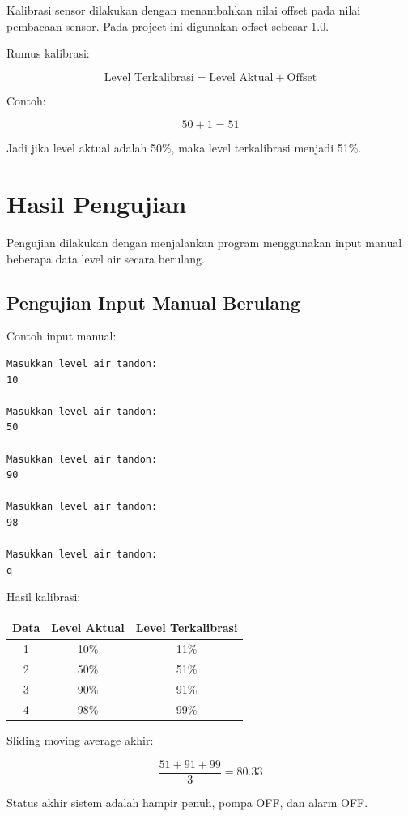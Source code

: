 \documentclass[12pt,a4paper]{article}
\begin{document}
Kalibrasi sensor dilakukan dengan menambahkan nilai offset pada nilai pembacaan sensor. Pada project ini digunakan offset sebesar 1.0.

Rumus kalibrasi:

\[
\text{Level Terkalibrasi} = \text{Level Aktual} + \text{Offset}
\]

Contoh:

\[
50 + 1 = 51
\]

Jadi jika level aktual adalah 50\%, maka level terkalibrasi menjadi 51\%.

\section{Hasil Pengujian}

Pengujian dilakukan dengan menjalankan program menggunakan input manual beberapa data level air secara berulang.

\subsection{Pengujian Input Manual Berulang}

Contoh input manual:

\begin{lstlisting}
Masukkan level air tandon:
10

Masukkan level air tandon:
50

Masukkan level air tandon:
90

Masukkan level air tandon:
98

Masukkan level air tandon:
q
\end{lstlisting}

Hasil kalibrasi:

\begin{center}
\begin{tabular}{|c|c|c|}
\hline
\textbf{Data} & \textbf{Level Aktual} & \textbf{Level Terkalibrasi} \\
\hline
1 & 10\% & 11\% \\
\hline
2 & 50\% & 51\% \\
\hline
3 & 90\% & 91\% \\
\hline
4 & 98\% & 99\% \\
\hline
\end{tabular}
\end{center}

Sliding moving average akhir:

\[
\frac{51 + 91 + 99}{3} = 80.33
\]

Status akhir sistem adalah hampir penuh, pompa OFF, dan alarm OFF.
\end{document}
